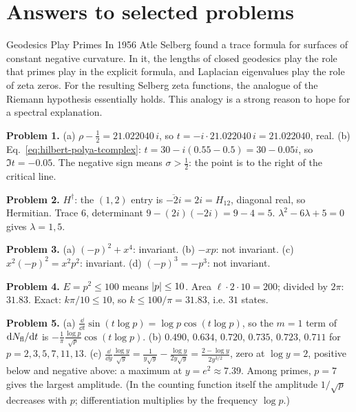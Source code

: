 \begin{problemlist}
\end{problemlist}

\section{Answers to selected problems}
\begin{didyouknow}{Geodesics Play Primes}
In 1956 Atle Selberg found a trace formula for surfaces of constant negative curvature. In it, the lengths of closed geodesics play the role that primes play in the explicit formula, and Laplacian eigenvalues play the role of zeta zeros. For the resulting Selberg zeta functions, the analogue of the Riemann hypothesis essentially holds. This analogy is a strong reason to hope for a spectral explanation.
\end{didyouknow}

\textbf{Problem 1.} (a) $\rho-\tfrac12=21.022040\,i$, so $t=-i\cdot21.022040\,i=21.022040$, real. (b) Eq.~\eqref{eq:hilbert-polya-tcomplex}: $t=30-i(0.55-0.5)=30-0.05i$, so $\Im t=-0.05$. The negative sign means $\sigma>\tfrac12$: the point is to the right of the critical line.

\textbf{Problem 2.} $H^\dagger$: the $(1,2)$ entry is $\overline{-2i}=2i=H_{12}$, diagonal real, so Hermitian. Trace $6$, determinant $9-(2i)(-2i)=9-4=5$. $\lambda^2-6\lambda+5=0$ gives $\lambda=1,5$.

\textbf{Problem 3.} (a) $(-p)^2+x^4$: invariant. (b) $-xp$: not invariant. (c) $x^2(-p)^2=x^2p^2$: invariant. (d) $(-p)^3=-p^3$: not invariant.

\textbf{Problem 4.} $E=p^2\le100$ means $\left\lvert p\right\rvert\le10$. Area $\ell\cdot2\cdot10=200$; divided by $2\pi$: $31.83$. Exact: $k\pi/10\le10$, so $k\le100/\pi=31.83$, i.e. $31$ states.

\textbf{Problem 5.} (a) $\frac{\dd}{\dd t}\sin(t\log p)=\log p\cos(t\log p)$, so the $m=1$ term of $\mathrm{d}N_{\mathrm{fl}}/\mathrm{d} t$ is $-\frac1\pi\frac{\log p}{\sqrt p}\cos(t\log p)$. (b) $0.490$, $0.634$, $0.720$, $0.735$, $0.723$, $0.711$ for $p=2,3,5,7,11,13$. (c) $\frac{\dd}{\dd y}\frac{\log y}{\sqrt y}=\frac{1}{y\sqrt y}-\frac{\log y}{2y\sqrt y}=\frac{2-\log y}{2y^{3/2}}$, zero at $\log y=2$, positive below and negative above: a maximum at $y=e^2\approx7.39$. Among primes, $p=7$ gives the largest amplitude. (In the counting function itself the amplitude $1/\sqrt p$ decreases with $p$; differentiation multiplies by the frequency $\log p$.)

